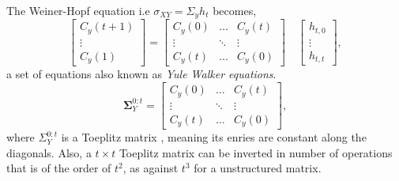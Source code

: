 \documentclass[11pt,english]{article}
\begin{document}
The Weiner-Hopf equation i.e {$\sigma_{XY} = \Sigma_y h_t$ becomes,
\begin{equation}\label{eqn:wh1}
\begin{bmatrix}
C_y(t+1)\\
\vdots\\
C_y(1)
\end{bmatrix}
=
\begin{bmatrix}
C_y(0) & \ldots & C_y(t)\\
\vdots & \ddots & \vdots\\
C_y(t) & \ldots & C_y(0)
\end{bmatrix}
\quad
\begin{bmatrix}
h_{t,0}\\
\vdots\\
h_{t,t}
\end{bmatrix},
\end{equation}
a set of equations also known as \emph{Yule Walker equations}.
\begin{equation*}
\mathbf{\Sigma}_{Y}^{0:t} =
\begin{bmatrix}
C_y(0) & \ldots & C_y(t)\\
\vdots & \ddots & \vdots\\
C_y(t) & \ldots & C_y(0)
\end{bmatrix},
\end{equation*}
where $\Sigma_{Y}^{0:t}$ is a Toeplitz matrix , meaning its enries are constant along the diagonals. Also, a $t\times t$ Toeplitz matrix can be inverted in number of operations that is of the order of $t^2$, as against $t^3$ for a unstructured matrix.
}
\end{document}
